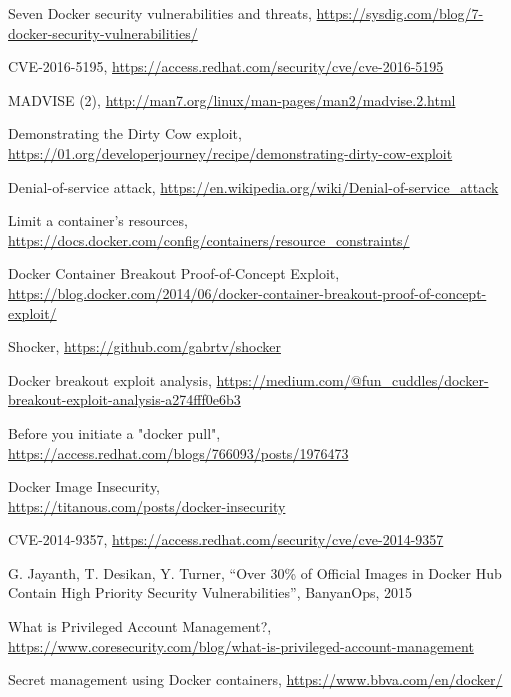 \documentclass[a4paper,12pt]{article}
\begin{document}
\begin{thebibliography}{99}
Seven Docker security vulnerabilities and threats,
\url{https://sysdig.com/blog/7-docker-security-vulnerabilities/}

CVE-2016-5195, \url{https://access.redhat.com/security/cve/cve-2016-5195} 

MADVISE (2), \url{http://man7.org/linux/man-pages/man2/madvise.2.html}

Demonstrating the Dirty Cow exploit,
\url{https://01.org/developerjourney/recipe/demonstrating-dirty-cow-exploit}

Denial-of-service attack,
\url{https://en.wikipedia.org/wiki/Denial-of-service_attack}

Limit a container's resources,
\url{https://docs.docker.com/config/containers/resource_constraints/}

Docker Container Breakout Proof-of-Concept Exploit,
\url{https://blog.docker.com/2014/06/docker-container-breakout-proof-of-concept-exploit/}

Shocker, \url{https://github.com/gabrtv/shocker}

Docker breakout exploit analysis,
\url{https://medium.com/@fun_cuddles/docker-breakout-exploit-analysis-a274fff0e6b3}

Before you initiate a "docker pull",
\url{https://access.redhat.com/blogs/766093/posts/1976473}

Docker Image Insecurity, \\ \url{https://titanous.com/posts/docker-insecurity}

CVE-2014-9357, \url{https://access.redhat.com/security/cve/cve-2014-9357}

G. Jayanth, T. Desikan, Y. Turner, ``Over 30\% of Official Images in Docker Hub
Contain High Priority Security Vulnerabilities'', BanyanOps, 2015

What is Privileged Account Management?,
\url{https://www.coresecurity.com/blog/what-is-privileged-account-management}

Secret management using Docker containers, \url{https://www.bbva.com/en/docker/}


\end{thebibliography}
\end{document}
